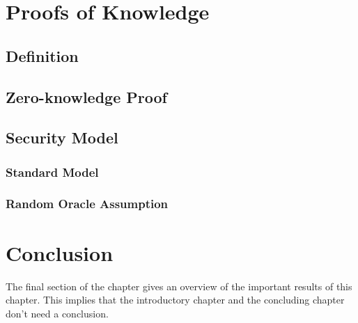 \section{Proofs of Knowledge}
\lipsum[63]

\subsection{Definition}
\lipsum[64]

\subsection{Zero-knowledge Proof}
\lipsum[65]

\subsection{Security Model}
\lipsum[66]

\subsubsection{Standard Model}
\lipsum[67]

\subsubsection{Random Oracle Assumption}
\lipsum[68]

\section{Conclusion}
The final section of the chapter gives an overview of the important results
of this chapter. This implies that the introductory chapter and the
concluding chapter don't need a conclusion.

\lipsum[66]

